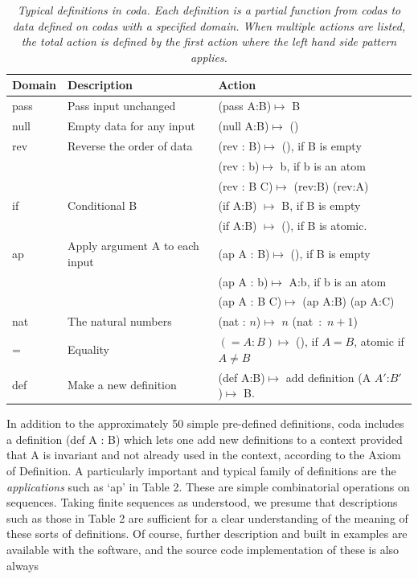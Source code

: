 \documentclass[11pt]{article}
\begin{document}
\begin{table}
\begin{tabular}{ | l | l | l | }
Domain & Description & Action \\
\hline
pass & Pass input unchanged & (pass A:B)$\mapsto$ B \\
\hline
null & Empty data for any input & (null A:B)$\mapsto$ () \\
\hline
rev & Reverse the order of data & (rev : B)$\mapsto$ (), if B is empty \\
 &  & (rev : b)$\mapsto$ b, if b is an atom \\
 & & (rev : B C)$\mapsto$ (rev:B) (rev:A) \\ 
 \hline
 if & Conditional B & (if A:B) $\mapsto$ B, if B is empty \\
 & & (if A:B) $\mapsto$ (), if B is atomic. \\
 \hline 
 ap & Apply argument A to each input & (ap A : B)$\mapsto$ (), if B is empty \\
  & & (ap A : b)$\mapsto$ A:b, if b is an atom \\
  & & (ap A : B C)$\mapsto$ (ap A:B) (ap A:C) \\  
\hline
nat & The natural numbers & (nat : $n$)$\mapsto$ $n$ (nat\ :\ $n+1$) \\
\hline
= & Equality & $(=A:B)\mapsto$ (), if $A=B$, atomic if $A\neq B$ \\
\hline
def & Make a new definition & (def A:B)$\mapsto$ add definition (A $A'$:$B'$)$\mapsto$ B. \\
\hline 
\end{tabular}
\caption{\label{ }{\it Typical definitions in coda.  Each definition is a partial function from codas to data defined on  
codas with a specified domain.  When multiple actions are listed, the total action is defined by the first action 
where the left hand side pattern applies.}}
\end{table}
In addition to the approximately 50 simple pre-defined definitions, coda includes a definition (def A : B) which lets one 
add new definitions to a context provided that A is invariant and not already used in the context, according to the Axiom of Definition.
A particularly important and typical family of definitions are the {\it applications} such as `ap' in Table 2.  These 
are simple combinatorial operations on sequences.  Taking finite sequences as understood, we presume that descriptions 
such as those in Table 2 are sufficient for a clear understanding of the meaning of these sorts of definitions.  Of course, further description and built in examples are available with the software, and the source code implementation of these is also always 
\end{document}
